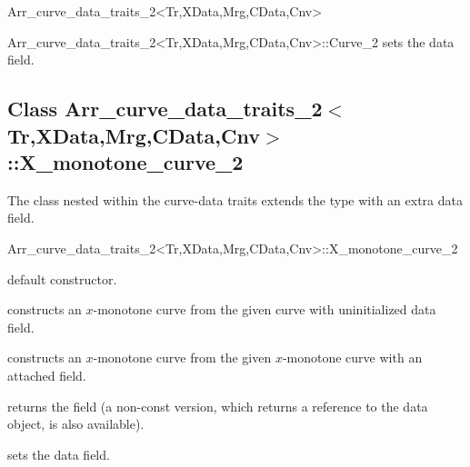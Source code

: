\begin{ccRefClass}{Arr_curve_data_traits_2<Tr,XData,Mrg,CData,Cnv>}
\begin{ccClass}{Arr_curve_data_traits_2<Tr,XData,Mrg,CData,Cnv>::Curve_2}
  {sets the data field.}

\end{ccClass}

\subsection*{Class Arr\_curve\_data\_traits\_2$<$Tr,XData,Mrg,CData,Cnv$>$::X\_monotone\_curve\_2}

The  class nested within the
curve-data traits extends the  type
with an extra data field.

\begin{ccClass}{Arr_curve_data_traits_2<Tr,XData,Mrg,CData,Cnv>::X_monotone_curve_2}

\ccInheritsFrom

\ccCreation
{}

    {default constructor.}

    {constructs an $x$-monotone curve from the given  curve with
     uninitialized data field.}

    {constructs an $x$-monotone curve from the given  $x$-monotone
     curve with an attached  field.}

\ccAccessFunctions

  {returns the field (a non-const version, which returns a reference
   to the data object, is also available).}

  {sets the data field.}

\end{ccClass}

\end{ccRefClass}

\ccRefPageEnd

